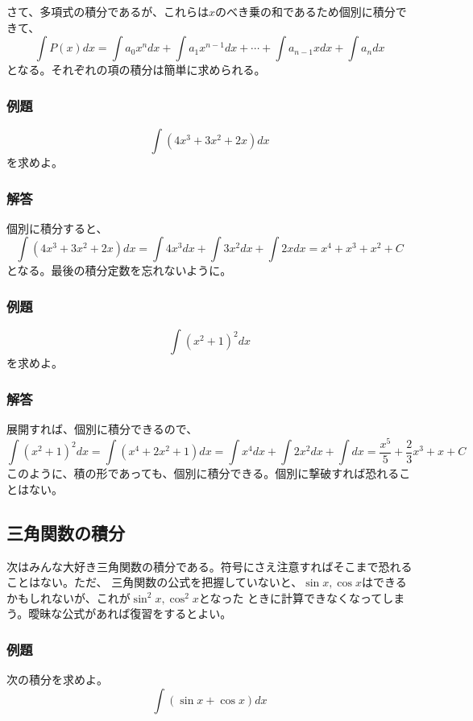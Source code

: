 \documentclass[a4j,dvipdfmx]{jsarticle}
\begin{document}
さて、多項式の積分であるが、これらは$x$のべき乗の和であるため個別に積分できて、
\begin{equation*}
    \int P(x)dx=\int a_0x^ndx +\int a_1 x^{n-1}dx+\cdots+\int a_{n-1}xdx+\int a_ndx
\end{equation*}
となる。それぞれの項の積分は簡単に求められる。
\subsubsection{例題}
\begin{equation*}
    \int (4x^3+3x^2+2x)dx
\end{equation*}
を求めよ。
\subsubsection*{解答}
個別に積分すると、
\begin{equation*}
    \int (4x^3+3x^2+2x)dx=\int 4x^3dx+\int 3x^2dx+\int 2xdx=x^4+x^3+x^2+C
\end{equation*}
となる。最後の積分定数を忘れないように。

\subsubsection{例題}
\begin{equation*}
    \int (x^2+1)^2dx
\end{equation*}
を求めよ。
\subsubsection*{解答}
展開すれば、個別に積分できるので、
\begin{equation*}
    \int (x^2+1)^2dx=\int (x^4+2x^2+1)dx=\int x^4dx+\int 2x^2dx+\int dx=\frac{x^5}{5}+\frac{2}{3}x^3+x+C
\end{equation*}
このように、積の形であっても、個別に積分できる。個別に撃破すれば恐れることはない。
\subsection{三角関数の積分}
次はみんな大好き三角関数の積分である。符号にさえ注意すればそこまで恐れることはない。ただ、
三角関数の公式を把握していないと、$\sin x,\cos x$はできるかもしれないが、これが$\sin^2 x,\cos^2 x$となった
ときに計算できなくなってしまう。曖昧な公式があれば復習をするとよい。
\subsubsection{例題}
次の積分を求めよ。
\begin{equation*}
    \int (\sin x+\cos x) dx
\end{equation*}
\end{document}
